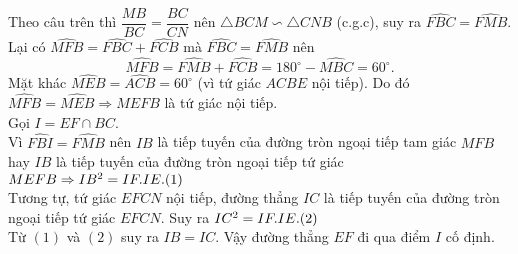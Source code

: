 \begin{ex}
{\begin{enumerate}
    Theo câu trên thì $\dfrac{MB}{BC}=\dfrac{BC}{CN}$ nên $\triangle BCM  \backsim \triangle CNB$ (c.g.c), suy ra $\widehat{FBC}=\widehat{FMB}$.\\
    Lại có $\widehat{MFB}=\widehat{FBC}+\widehat{FCB}$ mà $\widehat{FBC}=\widehat{FMB}$ nên 
    $$\widehat{MFB}=\widehat{FMB}+\widehat{FCB}=180^\circ - \widehat{MBC}=60^\circ.$$
    Mặt khác $\widehat{MEB}=\widehat{ACB}=60^\circ$ (vì tứ giác $ACBE$ nội tiếp). Do đó $\widehat{MFB}=\widehat{MEB}\Rightarrow MEFB$ là tứ giác nội tiếp.\\
    Gọi $I=EF \cap BC$.\\
    Vì $\widehat{FBI}=\widehat{FMB}$ nên $IB$ là tiếp tuyến của đường tròn ngoại tiếp tam giác $MFB$ hay $IB$ là tiếp tuyến của đường tròn ngoại tiếp tứ giác $MEFB \Rightarrow IB^2=IF.IE. \hfill (1)$\\
    Tương tự, tứ giác $EFCN$ nội tiếp, đường thẳng $IC$ là tiếp tuyến của đường tròn ngoại tiếp tứ giác $EFCN$. Suy ra $IC^2=IF.IE. \hfill (2)$\\
    Từ $(1)$ và $(2)$ suy ra $IB=IC$. Vậy đường thẳng $EF$ đi qua điểm $I$ cố định.
    \end{enumerate}
        }
\end{ex}


